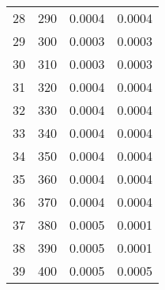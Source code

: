 \begin{table}
\begin{adjustbox}{width=1\textwidth/2}
\begin{tabular}{|c|c|c|c|}
\cline{1-4}
28 & 290 & 0.0004 & 0.0004 \\
\cline{1-4}
29 & 300 & 0.0003 & 0.0003 \\
\cline{1-4}
30 & 310 & 0.0003 & 0.0003 \\
\cline{1-4}
31 & 320 & 0.0004 & 0.0004 \\
\cline{1-4}
32 & 330 & 0.0004 & 0.0004 \\
\cline{1-4}
33 & 340 & 0.0004 & 0.0004 \\
\cline{1-4}
34 & 350 & 0.0004 & 0.0004 \\
\cline{1-4}
35 & 360 & 0.0004 & 0.0004 \\
\cline{1-4}
36 & 370 & 0.0004 & 0.0004 \\
\cline{1-4}
37 & 380 & 0.0005 & 0.0001 \\
\cline{1-4}
38 & 390 & 0.0005 & 0.0001 \\
\cline{1-4}
39 & 400 & 0.0005 & 0.0005 \\
\cline{1-4}
\end{tabular}
\end{adjustbox}
\end{table}

